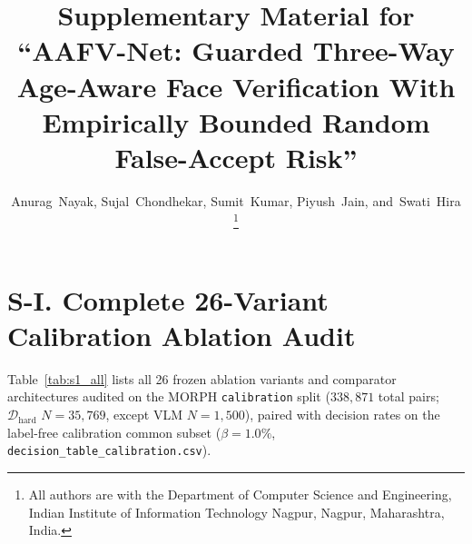 \documentclass[journal]{IEEEtran}
\begin{document}
\title{Supplementary Material for ``AAFV-Net: Guarded Three-Way Age-Aware Face Verification With Empirically Bounded Random False-Accept Risk''}
\author{Anurag~Nayak, Sujal~Chondhekar, Sumit~Kumar, Piyush~Jain, and~Swati~Hira%
\thanks{All authors are with the Department of Computer Science and Engineering, Indian Institute of Information Technology Nagpur, Nagpur, Maharashtra, India.}}
\maketitle

\section*{S-I. Complete 26-Variant Calibration Ablation Audit}
Table~\ref{tab:s1_all} lists all 26 frozen ablation variants and comparator architectures audited on the MORPH \texttt{calibration} split ($338{,}871$ total pairs; $\mathcal{D}_{\text{hard}}$ $N=35{,}769$, except VLM $N=1{,}500$), paired with decision rates on the label-free calibration common subset ($\beta = 1.0\%$, \texttt{decision\_table\_calibration.csv}).
\end{document}
